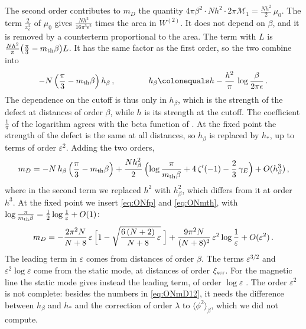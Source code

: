 \documentclass[a4paper,11pt]{article}
\newcommand{\xiscr}{\xi_{\rm scr}}
\begin{document}
The second order contributes to $m_D$ the quantity $4\pi\beta^2\cdot N h^2\cdot2\pi\mathcal{M}_1=\tfrac{N h^2}{2}\,\mu_0$. The term $\tfrac{2}{x_\epsilon^2}$ of $\mu_0$ gives $\tfrac{N h^2}{16\pi^3\epsilon^2}$ times the area in $W^{(2)}$. It does not depend on $\beta$, and it is removed by a counterterm proportional to the area. The term with $L$ is $\tfrac{N h^2}{\pi}\bigl(\tfrac\pi3-m_{\rm th}\beta\bigr)L$. It has the same factor as the first order, so the two combine into
\begin{equation}
	-N\,\Bigl(\frac\pi3-m_{\rm th}\beta\Bigr)\,h_\beta\, ,\qquad\qquad
	h_\beta\colonequals h-\frac{h^2}{\pi}\,\log\frac{\beta}{2\pi\epsilon}\, .
	\label{eq:ONhbeta}
\end{equation}
The dependence on the cutoff is thus only in $h_\beta$, which is the strength of the defect at distances of order $\beta$, while $h$ is its strength at the cutoff. The coefficient $\tfrac1\pi$ of the logarithm agrees with the beta function of \cite{Giombi:2023dqs}. At the fixed point the strength of the defect is the same at all distances, so $h_\beta$ is replaced by $h_*$, up to terms of order $\varepsilon^2$. Adding the two orders,
\begin{equation}\label{eq:ONmD12}
	m_D=-N\,h_\beta\,\Bigl(\frac\pi3-m_{\rm th}\beta\Bigr)+\frac{N h_\beta^2}{2}\,\Bigl(\log\frac{\pi}{m_{\rm th}\beta}+4\,\zeta'(-1)-\frac23\,\gamma_E\Bigr)+O(h_\beta^3)\, ,
\end{equation}
where in the second term we replaced $h^2$ with $h_\beta^2$, which differs from it at order $h^3$.
At the fixed point we insert \eqref{eq:ONfp} and \eqref{eq:ONmth}, with $\log\tfrac{\pi}{m_{\rm th}\beta}=\tfrac12\log\tfrac1\varepsilon+O(1)$:
\begin{equation}\label{eq:ONmD}
	m_D=-\frac{2\pi^2N}{N+8}\,\varepsilon\,\Bigl[1-\sqrt{\frac{6\,(N+2)}{N+8}\,\varepsilon}\;\Bigr]+\frac{9\pi^2N}{(N+8)^2}\,\varepsilon^2\log\frac1\varepsilon+O(\varepsilon^2)\, .
\end{equation}
The leading term in $\varepsilon$ comes from distances of order $\beta$. The terms $\varepsilon^{3/2}$ and $\varepsilon^2\log\varepsilon$ come from the static mode, at distances of order $\xiscr$. For the magnetic line the static mode gives instead the leading term, of order $\log\varepsilon$ \cite{BMP}. The order $\varepsilon^2$ is not complete: besides the numbers in \eqref{eq:ONmD12}, it needs the difference between $h_\beta$ and $h_*$ and the correction of order $\lambda$ to $\langle\phi^2\rangle_\beta$, which we did not compute.
\end{document}
